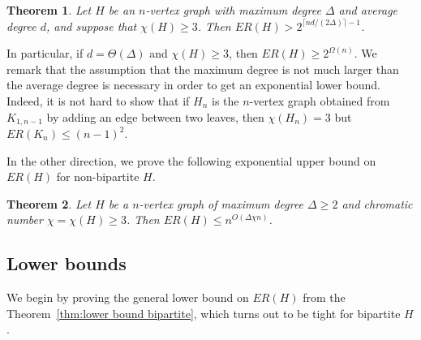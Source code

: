 \documentclass[a4paper,11pt]{article}
\newtheorem{theorem}{\bf Theorem}[section]
\theoremstyle{definition}
\begin{document}
\begin{theorem}\label{thm:lower bound non-bipartite}
    Let $H$ be an $n$-vertex graph with maximum degree $\Delta$ and average degree $d$, and suppose that $\chi(H) \geq 3$. Then $ER(H) > 2^{\lceil nd/(2\Delta)\rceil -1}$.
\end{theorem}
In particular, if $d = \Theta(\Delta)$ and $\chi(H) \geq 3$, then $ER(H) \geq 2^{\Omega(n)}$. We remark that the assumption that the maximum degree is not much larger than the average degree is necessary in order to get an exponential lower bound. Indeed, it is not hard to show that if $H_n$ is the $n$-vertex graph obtained from $K_{1,n-1}$ by adding an edge between two leaves, then $\chi(H_n)=3$ but $ER(K_n) \leq (n-1)^2$.

In the other direction, we prove the following exponential upper bound on $ER(H)$ for non-bipartite $H$.

\begin{theorem}\label{thm:upper bound non-bipartite}
Let $H$ be a $n$-vertex graph of maximum degree $\Delta \geq 2$ and chromatic number $\chi=\chi(H)\geq 3$. Then $ER(H)\leq n^{O(\Delta\chi n)}$.
\end{theorem}

\subsection{Lower bounds}

We begin by proving the general lower bound on $ER(H)$ from the Theorem~\ref{thm:lower bound bipartite}, which turns out to be tight for bipartite $H$.
\end{document}
